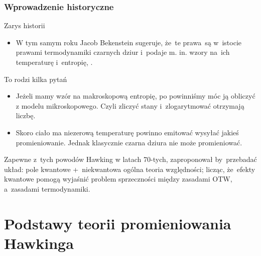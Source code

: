 \documentclass[10pt,t]{beamer}
\begin{document}
\begin{frame}
  \frametitle{Wprowadzenie historyczne}


  Zarys historii
  \begin{itemize}
    \RaggedRight

  \item W tym samym roku Jacob Bekenstein sugeruje, że~te prawa~są
    w~istocie prawami termodynamiki czarnych dziur i~podaje
    m. in. wzory na~ich temperaturę i~entropię,
    \cite{BekensteinBlackHolesAndEntropy1973}.

  \end{itemize}

  To rodzi kilka pytań
  \begin{itemize}
    \RaggedRight

  \item Jeżeli mamy wzór na makroskopową entropię, po powinniśmy móc
    ją obliczyć z modelu mikroskopowego. Czyli zliczyć stany
    i~zlogarytmować otrzymają liczbę.

  \item Skoro ciało ma niezerową temperaturę powinno emitować
    wysyłać jakieś promieniowanie. Jednak klasycznie czarna dziura
    nie może promieniować.

  \end{itemize}

  Zapewne z~tych powodów Hawking w latach 70-tych, zaproponował
  by~przebadać układ: pole kwantowe +~niekwantowa ogólna teoria
  względności; licząc, że~efekty kwantowe pomogą wyjaśnić problem
  sprzeczności między zasadami OTW, a~zasadami termodynamiki.

\end{frame}










\section[Podstawy teorii]{Podstawy teorii promieniowania Hawkinga}
\end{document}
